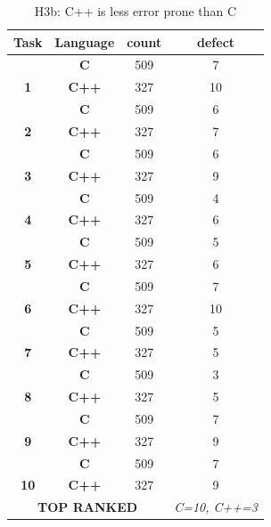 \documentclass[sigconf,review]{acmart}
\begin{document}
\begin{table}
\centering
\scriptsize
\renewcommand{\baselinestretch}{.5} 
\caption{H3b: C++ is less error prone than C}
\label{tab:h3b}
\begin{tabular}{|c|c|c|c|}
\hline
\textbf{Task} & \textbf{Language} & \textbf{count} & \textbf{defect} \\ \hline
 & \textbf{C} & 509 & \cellcolor[HTML]{C0C0C0}7 \\ \cline{2-4} 
\multirow{-2}{*}{\textbf{1}} & \textbf{C++} & 327 & 10 \\ \hline
 & \textbf{C} & 509 & \cellcolor[HTML]{C0C0C0}6 \\ \cline{2-4} 
\multirow{-2}{*}{\textbf{2}} & \textbf{C++} & 327 & \cellcolor[HTML]{C0C0C0}7 \\ \hline
 & \textbf{C} & 509 & \cellcolor[HTML]{C0C0C0}6 \\ \cline{2-4} 
\multirow{-2}{*}{\textbf{3}} & \textbf{C++} & 327 & 9 \\ \hline
 & \textbf{C} & 509 & \cellcolor[HTML]{C0C0C0}4 \\ \cline{2-4} 
\multirow{-2}{*}{\textbf{4}} & \textbf{C++} & 327 & 6 \\ \hline
 & \textbf{C} & 509 & \cellcolor[HTML]{C0C0C0}5 \\ \cline{2-4} 
\multirow{-2}{*}{\textbf{5}} & \textbf{C++} & 327 & 6 \\ \hline
 & \textbf{C} & 509 & \cellcolor[HTML]{C0C0C0}7 \\ \cline{2-4} 
\multirow{-2}{*}{\textbf{6}} & \textbf{C++} & 327 & \cellcolor[HTML]{C0C0C0}10 \\ \hline
 & \textbf{C} & 509 & \cellcolor[HTML]{C0C0C0}5 \\ \cline{2-4} 
\multirow{-2}{*}{\textbf{7}} & \textbf{C++} & 327 & \cellcolor[HTML]{C0C0C0}5 \\ \hline
 & \textbf{C} & 509 & \cellcolor[HTML]{C0C0C0}3 \\ \cline{2-4} 
\multirow{-2}{*}{\textbf{8}} & \textbf{C++} & 327 & 5 \\ \hline
 & \textbf{C} & 509 & \cellcolor[HTML]{C0C0C0}7 \\ \cline{2-4} 
\multirow{-2}{*}{\textbf{9}} & \textbf{C++} & 327 & 9 \\ \hline
 & \textbf{C} & 509 & \cellcolor[HTML]{C0C0C0}7 \\ \cline{2-4} 
\multirow{-2}{*}{\textbf{10}} & \textbf{C++} & 327 & 9 \\ \hline
\multicolumn{3}{|c|}{\textbf{TOP RANKED}} & \textit{C=10, C++=3} \\ \hline
\end{tabular}
\end{table}
\end{document}
